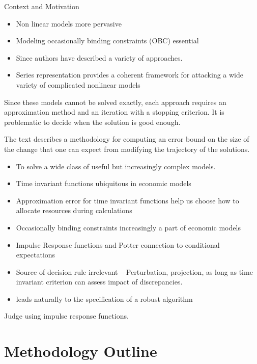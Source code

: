 \documentclass[12pt]{article}
\begin{document}
Context and Motivation
 \begin{itemize}
  \item Non linear models more pervasive
  \item Modeling occasionally binding constraints (OBC) essential
  \item Since \cite{Christiano2000} authors have described a variety of approaches. 

\cite{holden15:_exist_dsge,guerrieri15:_occbin,benigno09,hintermaier10,brumm10,nakov08,haefke98,nakata12,gordon11,billi11,Hintermaier2010,Guerrieri2015}
\item Series representation provides  a coherent framework for attacking a wide variety of complicated nonlinear models
      \end{itemize}

Since these models cannot be solved exactly, each approach requires an
approximation method and an iteration with a stopping criterion.
It is problematic to decide when the solution is good enough.

The text describes a methodology for computing an error bound on the 
size of the change that one can expect from modifying the trajectory of the 
solutions.

\begin{itemize}
\item To solve a wide class of useful but increasingly complex models. 
\item Time invariant functions ubiquitous in economic models
\item Approximation error for time invariant functions help us choose how to allocate resources during calculations
\item Occasionally binding constraints increasingly a part of economic models
\item Impulse Response functions and Potter connection to conditional expectations
\item Source of decision rule irrelevant --  Perturbation, projection, as long as time invariant criterion can assess impact of discrepancies.
\item leads naturally to the specification of a robust algorithm
\end{itemize}



Judge using impulse response functions.\cite{Potter2000}
\section{Methodology Outline}
\end{document}
